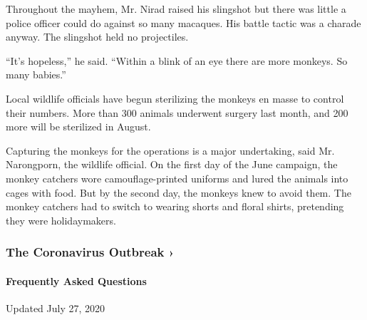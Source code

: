Throughout the mayhem, Mr. Nirad raised his slingshot but there was
little a police officer could do against so many macaques. His battle
tactic was a charade anyway. The slingshot held no projectiles.

``It's hopeless,'' he said. ``Within a blink of an eye there are more
monkeys. So many babies.''

Local wildlife officials have begun sterilizing the monkeys en masse to
control their numbers. More than 300 animals underwent surgery last
month, and 200 more will be sterilized in August.

Capturing the monkeys for the operations is a major undertaking, said
Mr. Narongporn, the wildlife official. On the first day of the June
campaign, the monkey catchers wore camouflage-printed uniforms and lured
the animals into cages with food. But by the second day, the monkeys
knew to avoid them. The monkey catchers had to switch to wearing shorts
and floral shirts, pretending they were holidaymakers.

\href{https://www.nytimes3xbfgragh.onion/news-event/coronavirus?action=click\&pgtype=Article\&state=default\&region=MAIN_CONTENT_3\&context=storylines_faq}{}

\hypertarget{the-coronavirus-outbreak-}{%
\subsubsection{The Coronavirus Outbreak
›}\label{the-coronavirus-outbreak-}}

\hypertarget{frequently-asked-questions}{%
\paragraph{Frequently Asked
Questions}\label{frequently-asked-questions}}

Updated July 27, 2020

